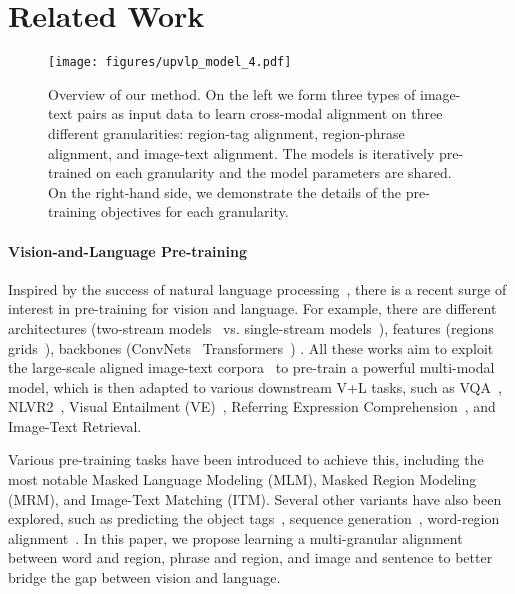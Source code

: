 \section{Related Work}
\begin{figure*}[ht!]
\centering
\texttt{[image: figures/upvlp\_model\_4.pdf]}
\caption{Overview of our method. On the left we form three types of image-text pairs as input data to learn cross-modal alignment on three different granularities: region-tag alignment, region-phrase alignment, and image-text alignment. The models is iteratively pre-trained on each granularity and the model parameters are shared. On the right-hand side, we demonstrate the details of the pre-training objectives for each granularity.  
}
\label{fig:model}
\end{figure*}

\paragraph{Vision-and-Language Pre-training}  
Inspired by the success of natural language processing~\cite{devlin2018bert, brown2020language}, there is a recent surge of interest in pre-training for vision and language.
For example, there are different architectures (\eg two-stream models~\cite{lu2019vilbert,tan2019lxmert,lu202012,yu2020ernie,li2021albef,kamath2021mdetr} vs. single-stream models~\cite{li2019visualbert,li2020unicoder,su2019vl,chen2020uniter,li2020unimo}), features (\eg regions~\cite{anderson2018bottom} \vs grids~\cite{huang2020pixel}), backbones (\eg ConvNets~\cite{huang2020pixel} \vs Transformers~\cite{kim2021vilt}) \etc.
All these works aim to exploit the large-scale aligned image-text corpora~\cite{lin2014microsoft,krishna2017visualgenome,sharma2018conceptual,ordonez2011sbu,kamath2021mdetr} to pre-train a powerful multi-modal model, which is then adapted to various downstream V+L tasks, such as VQA~\cite{antol2015vqa}, NLVR2~\cite{suhr2018corpus}, Visual Entailment (VE)~\cite{xie2019visual}, Referring Expression Comprehension~\cite{yu2016modeling}, and Image-Text Retrieval.

Various pre-training tasks have been introduced to achieve this, including the most notable Masked Language Modeling (MLM), Masked Region Modeling (MRM), and Image-Text Matching (ITM).
Several other variants have also been explored, such as predicting the object tags~\cite{li2020oscar, hu2020vivo}, sequence generation~\cite{zhou2020unified, wang2021simvlm}, word-region alignment~\cite{chen2020uniter}.
In this paper, we propose learning a multi-granular alignment between word and region, phrase and region, and image and sentence to better bridge the gap between vision and language.

